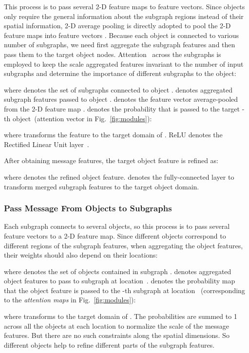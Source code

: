 \documentclass[runningheads]{llncs}
\begin{document}
This process is to pass several 2-D feature maps to feature vectors. 
Since objects only require the general information about the subgraph regions instead of their spatial information, 2-D average pooling is directly adopted to pool the 2-D feature maps  into feature vectors .  
Because each object is connected to various number of subgraphs, we need first aggregate the subgraph features and then pass them to the target object nodes. Attention~\cite{show_attend_tell} across the subgraphs is employed to keep the scale aggregated features invariant to the number of input subgraphs and determine the importance of different subgraphs to the object:



\noindent where  denotes the set of subgraphs connected to object .  denotes aggregated subgraph features passed to object .  denotes the feature vector average-pooled from the 2-D feature map .  denotes the probability that  is passed to the target -th object~(attention vector in Fig.~\ref{fig:modules}):


\noindent where  transforms the feature  to the target domain of . ReLU denotes the Rectified Linear Unit layer~\cite{relu}. 

After obtaining message features, the target object feature is refined as:

\noindent where  denotes the refined object feature.  denotes the fully-connected layer to transform merged subgraph features to the target object domain. 


\subsubsection{Pass Message From Objects to Subgraphs}
Each subgraph connects to several objects, so this process is to pass several feature vectors to a 2-D feature map. Since different objects correspond to different regions of the subgraph features, when aggregating the object features, their weights should also depend on their locations:



\noindent where  denotes the set of objects contained in subgraph .  denotes aggregated object features to pass to subgraph  at location~.  denotes the probability map that the object feature  is passed to the -th subgraph at location ~(corresponding to the \emph{attention maps} in Fig.~\ref{fig:modules}):



\noindent where  transforms  to the target domain of . 
The probabilities are summed to 1 across all the objects at each location to normalize the scale of the message features. But there are no such constraints along the spatial dimensions. So different objects help to refine different parts of the subgraph features. 
\end{document}

